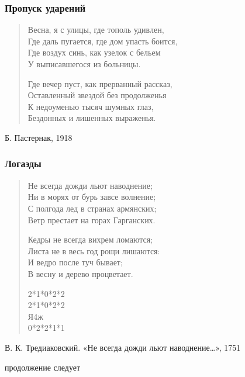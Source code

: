 \documentclass{beamer}
\begin{document}
\begin{frame}
\frametitle{Пропуск ударений}

\begin{verse}
Весна, я с улицы, где тополь удивлен, \\
Где даль пугается, где дом упасть боится,\\ 
Где воздух синь, как узелок с бельем \\
\alert{У выписавшегося из больницы}. 

Где вечер пуст, как прерванный рассказ,\\ 
Оставленный звездой без продолженья \\
К недоуменью тысяч шумных глаз, \\
Бездонных и лишенных выраженья. 
\end{verse}

Б. Пастернак, 1918

\end{frame}


\begin{frame}
\frametitle{Логаэды}

\begin{verse}
Не всегда дожди льют наводнение; \\
Ни в морях от бурь завсе волнение; \\
С полгода лед в странах армянских; \\
Ветр престает на горах Гарганских. 

Кедры не всегда вихрем ломаются; \\
Листа не в весь год рощи лишаются: \\
И ведро после туч бывает; \\
В весну и дерево процветает.

2*1*0*2*2 \\
2*1*0*2*2\\
Я4ж\\
0*2*2*1*1
\end{verse} 

В. К. Тредиаковский. «Не всегда дожди льют наводнение\dots», 1751

\end{frame}



\begin{frame}
\Huge{\centerline{продолжение следует}}
\end{frame}
\end{document}
